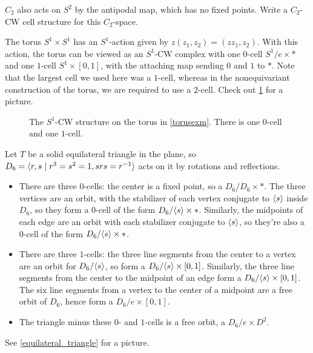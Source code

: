 \begin{ex}
$C_2$ also acts on $S^2$ by the antipodal map, which has no fixed points. Write a $C_2$-CW cell structure for this
$C_2$-space.
\end{ex}

\begin{exm}
\label{torusexm}
The torus $S^1 \times S^1$ has an $S^1$-action given by $z(z_1, z_2) = (zz_1, z_2)$. With this action, the torus
can be viewed as an $S^1$-CW complex with one $0$-cell $S^1/e \times *$ and one $1$-cell $S^1 \times [0,1]$, with
the attaching map sending $0$ and $1$ to $*$. Note that the largest cell we used here was a $1$-cell, whereas in
the nonequivariant construction of the torus, we are required to use a $2$-cell. Check out
\cref{equivariant_torus} for a picture.
\begin{figure}[h!]
\def\torlen{3}
\caption{The $S^1$-CW structure on the torus in \cref{torusexm}. There is one $0$-cell and one $1$-cell.}
\label{equivariant_torus}
\end{figure}
\end{exm}
\begin{exm}
\label{triangle_exm}
Let $T$ be a solid equilateral triangle in the plane, so $D_6 = \langle r,s\mid r^3 = s^2 = 1, srs = r^{-1}\rangle$ acts on
it by rotations and reflections.
\begin{itemize}
	\item There are three $0$-cells: the center is a fixed point, so a $D_6/D_6\times *$. The three vertices are
	an orbit, with the stabilizer of each vertex conjugate to $\langle s\rangle$ inside $D_6$, so they form a $0$-cell of the
	form $D_6/\langle s\rangle\times *$. Similarly, the midpoints of each edge are an orbit with each stabilizer conjugate to
	$\langle s\rangle$, so they're also a $0$-cell of the form $D_6/\langle s\rangle\times *$.
	\item There are three $1$-cells: the three line segments from the center to a vertex are an orbit for $D_6/\langle s\rangle$, so form a $D_6/\langle s\rangle\times[0,1]$. Similarly, the three line segments from the center to the midpoint of an
	edge form a $D_6/\langle s\rangle\times[0,1]$. The six line segments from a vertex to the center of a midpoint are a free
	orbit of $D_6$, hence form a $D_6/e\times[0,1]$.
	\item The triangle minus these $0$- and $1$-cells is a free orbit, a $D_6/e\times D^2$.
\end{itemize}
See \cref{equilateral_triangle} for a picture.
\end{exm}
